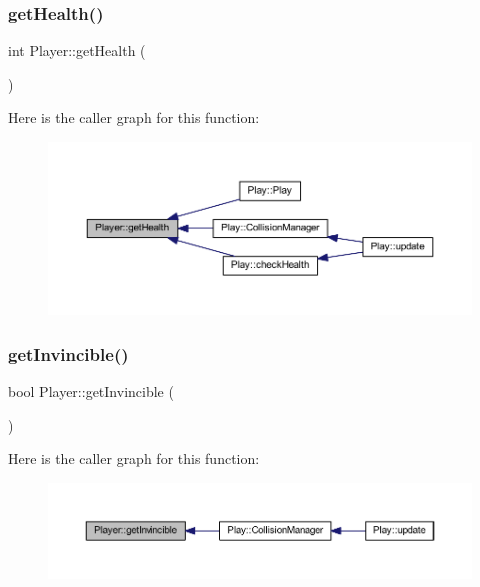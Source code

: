 \mbox{\label{class_player_abcb15d249bed9a4ab0ab86b52b0d747a}} 
\subsubsection{\texorpdfstring{get\+Health()}{getHealth()}}
{\footnotesize\ttfamily int Player\+::get\+Health (\begin{DoxyParamCaption}{ }\end{DoxyParamCaption})}

Here is the caller graph for this function\+:
\nopagebreak
\begin{figure}[H]
\begin{center}
\leavevmode
\includegraphics[width=350pt]{class_player_abcb15d249bed9a4ab0ab86b52b0d747a_icgraph}
\end{center}
\end{figure}
\mbox{\label{class_player_a35c75510e8be559cb1f9272bfc11d026}} 
\subsubsection{\texorpdfstring{get\+Invincible()}{getInvincible()}}
{\footnotesize\ttfamily bool Player\+::get\+Invincible (\begin{DoxyParamCaption}{ }\end{DoxyParamCaption})}

Here is the caller graph for this function\+:
\nopagebreak
\begin{figure}[H]
\begin{center}
\leavevmode
\includegraphics[width=350pt]{class_player_a35c75510e8be559cb1f9272bfc11d026_icgraph}
\end{center}
\end{figure}
\mbox{\label{class_player_a23356f99a9de86d3d47eadb679b332dc}} 
